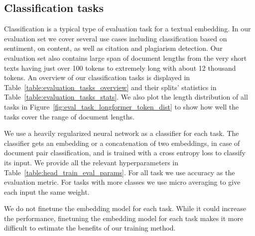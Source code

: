 \subsection{Classification tasks}

Classification is a typical type of evaluation task for a textual embedding. In
our evaluation set we cover several use cases including classification based on
sentiment, on content, as well as citation and plagiarism detection. Our
evaluation set also contains large span of document lengths from the very short
texts having just over 100 tokens to extremely long with about 12 thousand
tokens. An overview of our classification tasks is displayed in
Table~\ref{table:evaluation_tasks_overview} and their splits' statistics in
Table~\ref{table:evaluation_tasks_stats}. We also plot the length distribution
of all tasks in Figure~\ref{fig:eval_task_longformer_token_dist} to show how
well the tasks cover the range of document lengths.

We use a heavily regularized neural network as a classifier for each task. The
classifier gets an embedding or a concatenation of two embeddings, in case of
document pair classification, and is trained with a cross entropy loss to
classify its input. We provide all the relevant hyperparameters in
Table~\ref{table:head_train_eval_params}. For all task we use accuracy as the
evaluation metric. For tasks with more classes we use micro averaging to give
each input the same weight.

We do not finetune the embedding model for each task. While it could increase
the performance, finetuning the embedding model for each task makes it more
difficult to estimate the benefits of our training method.


